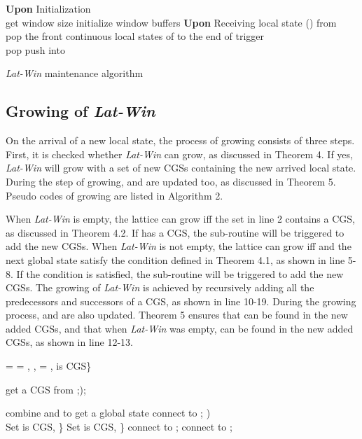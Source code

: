 \documentclass[12pt,journal,letterpaper,compsoc]{IEEEtran}
\begin{document}
\begin{algorithm}[htbp]
\SetAlgoVlined
\textbf{Upon} Initialization\\
    get window size \;
    initialize window buffers \;
\textbf{Upon} Receiving local state () from \\
    \;
    \If{}
    {
        pop the front continuous local states of  to the end of \;
        trigger \;
    }
    \vspace{0.3cm}
    \\
    \While{}
    {
        pop \;
        push  into  \tcc*[r]{}
    }
\caption{{\it Lat-Win} maintenance algorithm\label{A:Checker-Process}}
\end{algorithm}

\subsection{Growing of {\it Lat-Win}}

On the arrival of a new local state, the process of growing consists of three steps. First, it is checked whether {\it Lat-Win} can grow, as discussed in Theorem 4. If yes, {\it Lat-Win} will grow with a set of new CGSs containing the new arrived local state. During the step of growing,  and  are updated too, as discussed in Theorem 5. Pseudo codes of growing are listed in Algorithm 2.

When {\it Lat-Win} is empty, the lattice can grow iff the set  in line 2 contains a CGS, as discussed in Theorem 4.2. If  has a CGS, the  sub-routine will be triggered to add the new CGSs. When {\it Lat-Win} is not empty, the lattice can grow iff  and the next global state satisfy the condition defined in Theorem 4.1, as shown in line 5-8. If the condition is satisfied, the  sub-routine will be triggered to add the new CGSs. The growing of {\it Lat-Win} is achieved by recursively adding all the predecessors and successors of a CGS, as shown in line 10-19. During the growing process,  and  are also updated. Theorem 5 ensures that  can be found in the new added CGSs, and that when {\it Lat-Win} was empty,  can be found in the new added CGSs, as shown in line 12-13.

\begin{algorithm}[htbp]
\SetAlgoVlined
{}
{
     =  = , ,  = ,  is CGS\}\;
    \If{} {
        get a CGS  from ;\hspace{0.05in});

    }
}
\ElseIf{}
{
    combine  and  to get a global state \;
    {
        connect  to ;\hspace{0.05in}\;
    }
}
\vspace{0.3cm}
)\\
Set  is CGS, \}\;
Set  is CGS, \}\;
\lIf{}
{
    \;
}
\lIf{}
{
    \;
}
{
    {
        connect  to ;\hspace{0.05in}\;
    }
}
{
    {
        connect  to ;\hspace{0.05in}\;
    }
}
\caption{\label{A:grow_lattice()}}
\end{algorithm}
\end{document}
